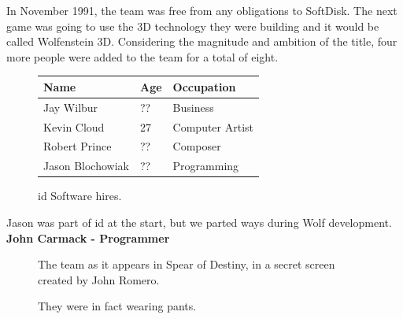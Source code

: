 \documentclass[book.tex]{subfiles}
\begin{document}
In November 1991, the team was free from any obligations to SoftDisk. The next game was going to use the 3D technology they were building and it would be called Wolfenstein 3D. Considering the magnitude and ambition of the title, four more people were added to the team for a total of eight.\\
 \begin{figure}[H]
\centering  
\begin{tabularx}{\textwidth}{ X  X  X  }
  \toprule
  \textbf{Name} &  \textbf{Age} & \textbf{Occupation} \\
  \toprule 
   Jay Wilbur & ?? &  Business\\
   Kevin Cloud\protect\footnotemark & 27 &  Computer Artist\\
   Robert Prince\protect\footnotemark & ?? &  Composer\\
   Jason Blochowiak\protect\footnotemark & ?? &   Programming\\
     \toprule
\end{tabularx}
\caption{id Software hires.}\label{fig:Id Software hires}
\end{figure}
\addtocounter{footnote}{-2}

\begin{fancyquotes}
Jason was part of id at the start, but we parted ways during Wolf development.
 \bigskip \\
\textbf{John Carmack - Programmer}
 \end{fancyquotes}


 
\begin{figure}[H]
\centering
\caption{The team as it appears in Spear of Destiny, in a secret screen created by John Romero.}
\label{fig:id_team_1993}
\end{figure}
 
\begin{figure}[H]
\centering
\caption{They were in fact wearing pants.}
\label{fig:id_team_1993}
\end{figure}
\end{document}
